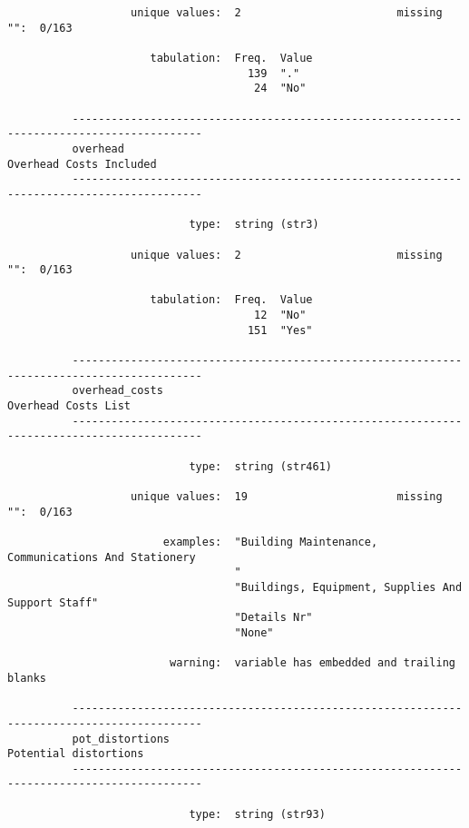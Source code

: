 \documentclass{article}
\begin{document}
\begin{verbatim}
                   unique values:  2                        missing "":  0/163
          
                      tabulation:  Freq.  Value
                                     139  "."
                                      24  "No"
          
          ------------------------------------------------------------------------------------------
          overhead                                                           Overhead Costs Included
          ------------------------------------------------------------------------------------------
          
                            type:  string (str3)
          
                   unique values:  2                        missing "":  0/163
          
                      tabulation:  Freq.  Value
                                      12  "No"
                                     151  "Yes"
          
          ------------------------------------------------------------------------------------------
          overhead_costs                                                         Overhead Costs List
          ------------------------------------------------------------------------------------------
          
                            type:  string (str461)
          
                   unique values:  19                       missing "":  0/163
          
                        examples:  "Building Maintenance, Communications And Stationery
                                   "
                                   "Buildings, Equipment, Supplies And Support Staff"
                                   "Details Nr"
                                   "None"
          
                         warning:  variable has embedded and trailing blanks
          
          ------------------------------------------------------------------------------------------
          pot_distortions                                                      Potential distortions
          ------------------------------------------------------------------------------------------
          
                            type:  string (str93)
          

\end{verbatim}
\end{document}
